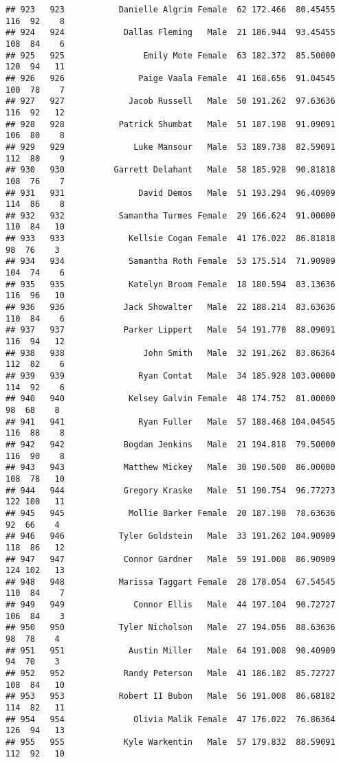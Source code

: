 \documentclass[
]{article}
\begin{document}
\begin{verbatim}
## 923   923           Danielle Algrim Female  62 172.466  80.45455 116  92    8
## 924   924            Dallas Fleming   Male  21 186.944  93.45455 108  84    6
## 925   925                Emily Mote Female  63 182.372  85.50000 120  94   11
## 926   926               Paige Vaala Female  41 168.656  91.04545 100  78    7
## 927   927             Jacob Russell   Male  50 191.262  97.63636 116  92   12
## 928   928           Patrick Shumbat   Male  51 187.198  91.09091 106  80    8
## 929   929              Luke Mansour   Male  53 189.738  82.59091 112  80    9
## 930   930          Garrett Delahant   Male  58 185.928  90.81818 108  76    7
## 931   931               David Demos   Male  51 193.294  96.40909 114  86    8
## 932   932           Samantha Turmes Female  29 166.624  91.00000 110  84   10
## 933   933             Kellsie Cogan Female  41 176.022  86.81818  98  76    3
## 934   934             Samantha Roth Female  53 175.514  71.90909 104  74    6
## 935   935             Katelyn Broom Female  18 180.594  83.13636 116  96   10
## 936   936            Jack Showalter   Male  22 188.214  83.63636 110  84    6
## 937   937            Parker Lippert   Male  54 191.770  88.09091 116  94   12
## 938   938                John Smith   Male  32 191.262  83.86364 112  82    6
## 939   939               Ryan Contat   Male  34 185.928 103.00000 114  92    6
## 940   940             Kelsey Galvin Female  48 174.752  81.00000  98  68    8
## 941   941               Ryan Fuller   Male  57 188.468 104.04545 116  88    8
## 942   942            Bogdan Jenkins   Male  21 194.818  79.50000 116  90    8
## 943   943            Matthew Mickey   Male  30 190.500  86.00000 108  78   10
## 944   944            Gregory Kraske   Male  51 190.754  96.77273 122 100   11
## 945   945             Mollie Barker Female  20 187.198  78.63636  92  66    4
## 946   946           Tyler Goldstein   Male  33 191.262 104.90909 118  86   12
## 947   947            Connor Gardner   Male  59 191.008  86.90909 124 102   13
## 948   948           Marissa Taggart Female  28 178.054  67.54545 110  84    7
## 949   949              Connor Ellis   Male  44 197.104  90.72727 106  84    3
## 950   950           Tyler Nicholson   Male  27 194.056  88.63636  98  78    4
## 951   951             Austin Miller   Male  64 191.008  90.40909  94  70    3
## 952   952            Randy Peterson   Male  41 186.182  85.72727 108  84   10
## 953   953           Robert II Bubon   Male  56 191.008  86.68182 114  82   11
## 954   954              Olivia Malik Female  47 176.022  76.86364 126  94   13
## 955   955            Kyle Warkentin   Male  57 179.832  88.59091 112  92   10

\end{verbatim}
\end{document}
